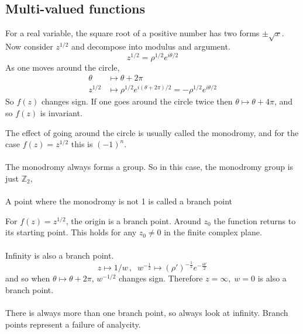 \documentclass{article}
\begin{document}
\subsection*{Multi-valued functions}
For a real variable, the square root of a positive number has two forms
$\pm \sqrt{x} $.
\\
Now consider $z^{1/2}$ and decompose into modulus and argument.
\[z^{1/2} = \rho^{1/2} e^{i\theta /2} \]
As one moves around the circle,
\begin{align*}
\theta & \mapsto \theta + 2\pi \\
z^{1/2} & \mapsto \rho^{1/2} e^{i(\theta + 2\pi)/2} = -\rho^{1/2}
e^{i\theta /2} 
\end{align*}
So $f(z)$ changes sign. If one goes around the circle twice then
$\theta \mapsto \theta + 4\pi$, and so $f(z)$ is invariant.
\\
\begin{framed}
\noindent The effect of going around the circle is usually called the monodromy,
and for the case $f(z) = z^{1/2}$ this is $(-1)^n$.
\\
\\
The monodromy always forms a group. So in this case, the monodromy group
is just $\mathbb{Z}_2$,
\\
\\
A point where the monodromy is not 1 is called a branch point
\end{framed}
\noindent For $f(z) = z^{1/2}$, the origin is a branch point. Around $z_0$
the function returns to its starting point. This holds for any $z_0 \neq 0$
in the finite complex plane.
\\
\\
Infinity is also a branch point.
\[ z \mapsto 1/w \, , \;\; w^{-\frac{1}{2}} \mapsto (\rho')^{-\frac{1}{2}} 
e^{-\frac{i\theta'}{2}}\]
and so when $\theta \mapsto \theta + 2\pi$, $w^{-1/2}$ changes sign.
Therefore $z= \infty, \; w=0$ is also a branch point.
\\
\\
There is always more than one branch point, so always look at infinity.
Branch points represent a failure of analycity.
\end{document}
